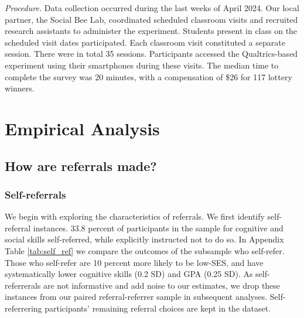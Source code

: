 \documentclass[11pt,a4paper,oneside]{article}
\begin{document}
\noindent \textit{Procedure.} Data collection occurred during the last weeks of April 2024. Our local partner, the Social Bee Lab, coordinated scheduled classroom visits and recruited research assistants to administer the experiment. Students present in class on the scheduled visit dates participated. Each classroom visit constituted a separate session. There were in total 35 sessions. Participants accessed the Qualtrics-based experiment using their smartphones during these visits. The median time to complete the survey was 20 minutes, with a compensation of \$26 for 117 lottery winners.

\section{Empirical Analysis}
\subsection{How are referrals made?}
\subsubsection*{Self-referrals}
We begin with exploring the characteristics of referrals. We first identify self-referral instances.  33.8 percent of participants in the sample for cognitive and social skills self-referred, while explicitly instructed not to do so. In Appendix Table \ref{tab:self_ref} we compare the outcomes of the subsample who self-refer. Those who self-refer are 10 percent more likely to be low-SES, and have systematically lower cognitive skills (0.2 SD) and GPA (0.25 SD). As self-referrerals are not informative and add noise to our estimates, we drop these instances from our paired referral-referrer sample in subsequent analyses. Self-referrering participants' remaining referral choices are kept in the dataset.
\end{document}
